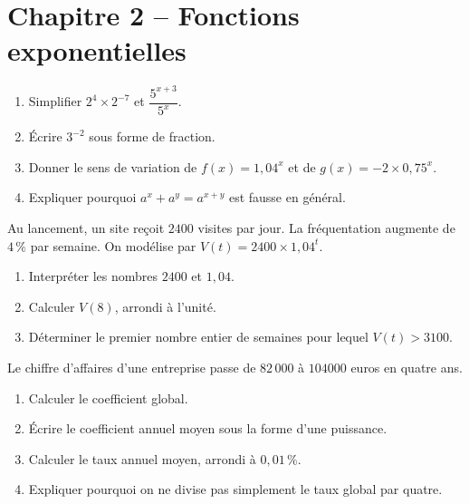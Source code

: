 
\section*{Chapitre 2 -- Fonctions exponentielles}
\begin{exercice}
\begin{enumerate}
\item Simplifier $2^4\times2^{-7}$ et $\dfrac{5^{x+3}}{5^x}$.
\item Écrire $3^{-2}$ sous forme de fraction.
\item Donner le sens de variation de $f(x)=1{,}04^x$ et de $g(x)=-2\times0{,}75^x$.
\item Expliquer pourquoi $a^x+a^y=a^{x+y}$ est fausse en général.
\end{enumerate}
\end{exercice}
\begin{exercice}
Au lancement, un site reçoit $2400$ visites par jour. La fréquentation augmente de $4\,\%$ par semaine. On modélise par $V(t)=2400\times1{,}04^t$.
\begin{enumerate}
\item Interpréter les nombres $2400$ et $1{,}04$.
\item Calculer $V(8)$, arrondi à l'unité.
\item Déterminer le premier nombre entier de semaines pour lequel $V(t)>3100$.
\end{enumerate}
\end{exercice}
\begin{exercice}
Le chiffre d'affaires d'une entreprise passe de $82\,000$ à $104000$ euros en quatre ans.
\begin{enumerate}
\item Calculer le coefficient global.
\item Écrire le coefficient annuel moyen sous la forme d'une puissance.
\item Calculer le taux annuel moyen, arrondi à $0{,}01\,\%$.
\item Expliquer pourquoi on ne divise pas simplement le taux global par quatre.
\end{enumerate}
\end{exercice}
